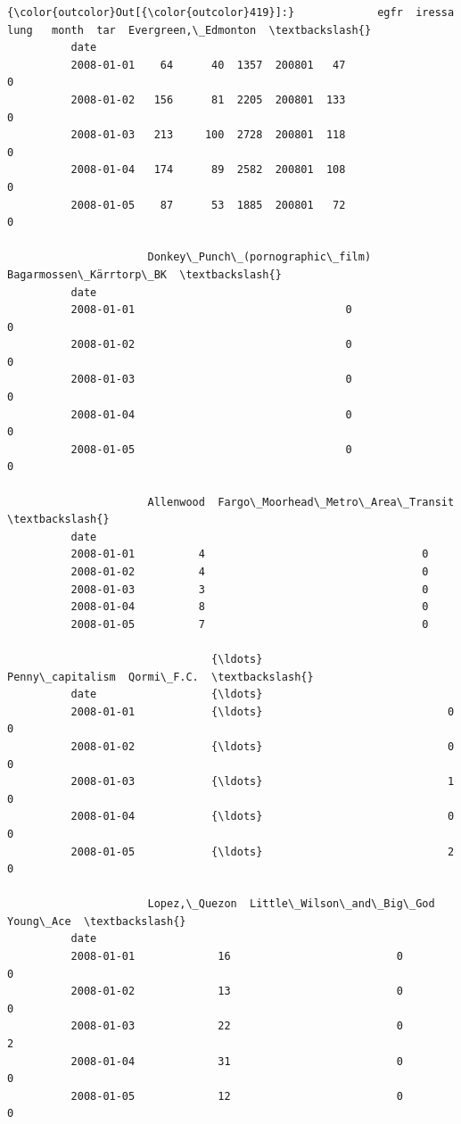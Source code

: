 \documentclass{article}
\begin{document}
            \begin{Verbatim}[commandchars=\\\{\}]
{\color{outcolor}Out[{\color{outcolor}419}]:}             egfr  iressa  lung   month  tar  Evergreen,\_Edmonton  \textbackslash{}
          date
          2008-01-01    64      40  1357  200801   47                    0
          2008-01-02   156      81  2205  200801  133                    0
          2008-01-03   213     100  2728  200801  118                    0
          2008-01-04   174      89  2582  200801  108                    0
          2008-01-05    87      53  1885  200801   72                    0

                      Donkey\_Punch\_(pornographic\_film)  Bagarmossen\_Kärrtorp\_BK  \textbackslash{}
          date
          2008-01-01                                 0                        0
          2008-01-02                                 0                        0
          2008-01-03                                 0                        0
          2008-01-04                                 0                        0
          2008-01-05                                 0                        0

                      Allenwood  Fargo\_Moorhead\_Metro\_Area\_Transit  \textbackslash{}
          date
          2008-01-01          4                                  0
          2008-01-02          4                                  0
          2008-01-03          3                                  0
          2008-01-04          8                                  0
          2008-01-05          7                                  0

                                {\ldots}              Penny\_capitalism  Qormi\_F.C.  \textbackslash{}
          date                  {\ldots}
          2008-01-01            {\ldots}                             0           0
          2008-01-02            {\ldots}                             0           0
          2008-01-03            {\ldots}                             1           0
          2008-01-04            {\ldots}                             0           0
          2008-01-05            {\ldots}                             2           0

                      Lopez,\_Quezon  Little\_Wilson\_and\_Big\_God  Young\_Ace  \textbackslash{}
          date
          2008-01-01             16                          0          0
          2008-01-02             13                          0          0
          2008-01-03             22                          0          2
          2008-01-04             31                          0          0
          2008-01-05             12                          0          0


\end{Verbatim}
\end{document}
